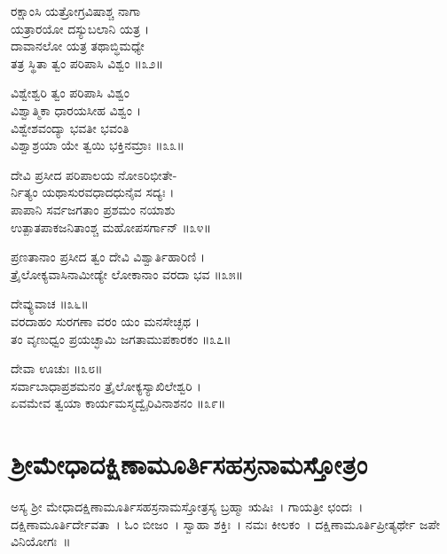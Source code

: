 ರಕ್ಷಾಂಸಿ ಯತ್ರೋಗ್ರವಿಷಾಶ್ಚ ನಾಗಾ\\
        ಯತ್ರಾರಯೋ ದಸ್ಯುಬಲಾನಿ ಯತ್ರ ।\\
ದಾವಾನಲೋ ಯತ್ರ ತಥಾಬ್ಧಿಮಧ್ಯೇ\\
        ತತ್ರ ಸ್ಥಿತಾ ತ್ವಂ ಪರಿಪಾಸಿ ವಿಶ್ವಂ ॥೩೨॥

ವಿಶ್ವೇಶ್ವರಿ ತ್ವಂ ಪರಿಪಾಸಿ ವಿಶ್ವಂ\\
        ವಿಶ್ವಾತ್ಮಿಕಾ ಧಾರಯಸೀಹ ವಿಶ್ವಂ ।\\
ವಿಶ್ವೇಶವಂದ್ಯಾ ಭವತೀ ಭವಂತಿ\\
        ವಿಶ್ವಾಶ್ರಯಾ ಯೇ ತ್ವಯಿ ಭಕ್ತಿನಮ್ರಾಃ ॥೩೩॥

ದೇವಿ ಪ್ರಸೀದ ಪರಿಪಾಲಯ ನೋಽರಿಭೀತೇ-\\
      ರ್ನಿತ್ಯಂ ಯಥಾಸುರವಧಾದಧುನೈವ ಸದ್ಯಃ ।\\
ಪಾಪಾನಿ ಸರ್ವಜಗತಾಂ ಪ್ರಶಮಂ ನಯಾಶು\\
        ಉತ್ಪಾತಪಾಕಜನಿತಾಂಶ್ಚ ಮಹೋಪಸರ್ಗಾನ್ ॥೩೪॥

ಪ್ರಣತಾನಾಂ ಪ್ರಸೀದ ತ್ವಂ ದೇವಿ ವಿಶ್ವಾರ್ತಿಹಾರಿಣಿ ।\\
ತ್ರೈಲೋಕ್ಯವಾಸಿನಾಮೀಡ್ಯೇ ಲೋಕಾನಾಂ ವರದಾ ಭವ ॥೩೫॥

ದೇವ್ಯುವಾಚ ॥೩೬॥\\
ವರದಾಹಂ ಸುರಗಣಾ ವರಂ ಯಂ ಮನಸೇಚ್ಛಥ ।\\
ತಂ ವೃಣುಧ್ವಂ ಪ್ರಯಚ್ಛಾಮಿ ಜಗತಾಮುಪಕಾರಕಂ ॥೩೭॥

ದೇವಾ ಊಚುಃ ॥೩೮॥\\
ಸರ್ವಾಬಾಧಾಪ್ರಶಮನಂ ತ್ರೈಲೋಕ್ಯಸ್ಯಾಖಿಲೇಶ್ವರಿ ।\\
ಏವಮೇವ ತ್ವಯಾ ಕಾರ್ಯಮಸ್ಮದ್ವೈರಿವಿನಾಶನಂ ॥೩೯॥
\section{ಶ್ರೀಮೇಧಾದಕ್ಷಿಣಾಮೂರ್ತಿಸಹಸ್ರನಾಮಸ್ತೋತ್ರಂ}
ಅಸ್ಯ ಶ್ರೀ ಮೇಧಾದಕ್ಷಿಣಾಮೂರ್ತಿಸಹಸ್ರನಾಮಸ್ತೋತ್ರಸ್ಯ ಬ್ರಹ್ಮಾ ಋಷಿಃ~। ಗಾಯತ್ರೀ ಛಂದಃ~। ದಕ್ಷಿಣಾಮೂರ್ತಿರ್ದೇವತಾ~। ಓಂ ಬೀಜಂ~। ಸ್ವಾಹಾ ಶಕ್ತಿಃ~। ನಮಃ ಕೀಲಕಂ~। ದಕ್ಷಿಣಾಮೂರ್ತಿಪ್ರೀತ್ಯರ್ಥೇ ಜಪೇ ವಿನಿಯೋಗಃ~॥

